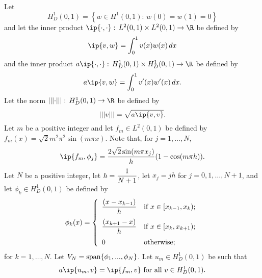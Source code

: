 
Let
\[
H^1_D(0,1)=\left\{w\in H^1(0,1):\,w(0)=w(1)=0\right\}
\]
and let the inner product $\ip{\cdot,\cdot}:\,L^2(0,1)\times L^2(0,1)\to\R$ be defined by
\[
\ip{v,w}=\int_0^1v(x)w(x)\,dx
\]
and the inner product $a\ip{\cdot,\cdot}:\,H^1_D(0,1)\times H^1_D(0,1)\to\R$ be defined by
\[
a\ip{v,w}=\int_0^1v'(x)w'(x)\,dx.
\]
Let the norm $\left|\left|\left|\cdot\right|\right|\right|:\,H^1_D(0,1)\to\R$ be defined by
\[
\left|\left|\left|v\right|\right|\right|=\sqrt{a\ip{v,v}}.
\]
Let $m$ be a positive integer and let $f_m\in L^2(0,1)$ be defined by $f_m(x)=\sqrt{2}m^2\pi^2\sin(m\pi x)$. Note that, for $j=1,\ldots,N$,
\[
\ip{f_m,\phi_j} = {2\sqrt{2}\sin(m\pi x_j) \over h} (1 - \cos(m\pi h)).
\]
Let $N$ be a positive integer, let $\displaystyle{h={1 \over N+1}}$, let $x_j=jh$ for $j=0,1,\ldots,N+1$, and let $\phi_k\in H^1_D(0,1)$ be defined by
\[
\phi_k(x) = \left\{\begin{array}{ll}
\displaystyle{{(x-x_{k-1}) \over h}} & \displaystyle{\mbox{if }x\in[x_{k-1},x_k)};
\\[10pt]
\displaystyle{{(x_{k+1}-x) \over h}} & \displaystyle{\mbox{if }x\in[x_k,x_{k+1})};
\\[10pt]
0 & \mbox{otherwise};
\end{array}\right.
\]
for $k=1,\ldots,N$. Let $V_N={\rm span}\{\phi_1,...,\phi_N\}$. Let $u_m\in H^1_D(0,1)$ be such that
\[
a\ip{u_m,v}=\ip{f_m,v}\mbox{ for all }v\in H^1_D(0,1).
\]
\\
